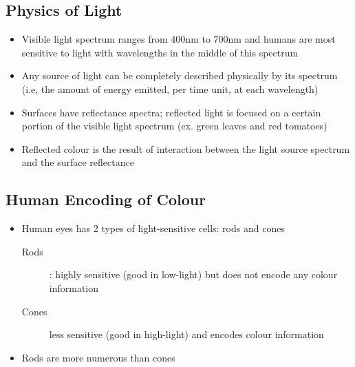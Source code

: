 \documentclass[letterpaper,12pt]{article}
\begin{document}
\subsection{Physics of Light}
\begin{itemize}
 \item Visible light spectrum ranges from 400nm to 700nm and humans are most sensitive to light with wavelengths in the middle of this spectrum
 \item Any source of light can be completely described physically by its spectrum (i.e, the amount of energy emitted, per time unit, at each wavelength)
 \item Surfaces have reflectance spectra; reflected light is focused on a certain portion of the visible light spectrum (ex. green leaves and red tomatoes)
 \item Reflected colour is the result of interaction between the light source spectrum and the surface reflectance
\end{itemize}

\subsection{Human Encoding of Colour}
\begin{itemize}
 \item Human eyes has 2 types of light-sensitive cells: rods and cones
       \begin{description}
        \item[Rods]: highly sensitive (good in low-light) but does not encode any colour information
        \item[Cones] less sensitive (good in high-light) and encodes colour information
       \end{description}
 \item Rods are more numerous than cones
\end{itemize}
\end{document}
